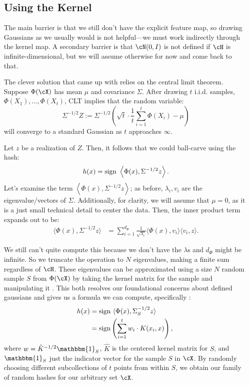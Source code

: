 \documentclass[twoside,11pt]{homework}
\begin{document}
\begin{multicols}{2}
\subsection{Using the Kernel}

The main barrier is that we still don't have the explicit feature map,
so drawing Gaussians as we usually would is not helpful---we must work
indirectly through the kernel map.  A secondary barrier is that
$\cN(0,I)$ is not defined if $\cH$ is infinite-dimensional, but we
will assume otherwise for now and come back to that.

The clever solution that \cite{K2012} came up with relies on the central limit theorem. Suppose $\Phi(\cX)$ has mean $\mu$ and covariance $\Sigma$. After drawing $t$ i.i.d. samples, $\Phi(X_1),\dotsc, \Phi(X_t)$, CLT implies that the random variable:
\[\Sigma^{-1/2} Z := \Sigma^{-1/2} \left(\sqrt{t} \cdot \frac{1}{t} \sum_{i=1}^t \Phi(X_i) - \mu\right)\]
will converge to a standard Gaussian as $t$ approaches $\infty$.

Let $z$ be a realization of $Z$. Then, it follows that we could ball-carve using the hash:
\[h(x) = \operatorname{sign} \ \left\langle \Phi(x), \Sigma^{-1/2}z\right\rangle.\]
Let's examine the term $\left\langle \Phi(x), \Sigma^{-1/2}z\right\rangle$; as before, $\lambda_i, v_i$ are the eigenvalue/vectors of $\Sigma$. Additionally, for clarity, we will assume that $\mu = 0$, as it is a just small technical detail to center the data. Then, the inner product term expands out to be:
\begin{align*}
  \langle \Phi(x), \Sigma^{-1/2} z\rangle &= \sum_{i=1}^{d_\Phi} \frac{1}{\sqrt{\lambda_i}} \langle \Phi(x), v_i\rangle \langle v_i , z\rangle.
\end{align*}

We still can't quite compute this because we don't have the $\lambda$s
and $d_\Phi$ might be infinite.  So we truncate the operation to $N$
eigenvalues, making a finite sum regardless of $\cH$.  These
eigenvalues can be approximated using a size $N$ random sample $S$ from
$\Phi(\cX)$ by taking the kernel matrix for the sample and
manipulating it \cite{something}.  This both resolves our foundational
concerns about defined gaussians and gives us a formula we can
compute, specifically \cite{K2012}:
\begin{align}
  h(x) &= \operatorname{sign} \ \langle \Phi(x), \Sigma_S^{-1/2} z\rangle \nonumber\\ 
  &= \operatorname{sign}\left(\sum_{i=1}^t w_i \cdot K(x_i, x)\right),\
\end{align}
where $w = \hat{K}^{-1/2}\mathbbm{1}_S$, $\hat{K}$ is the centered kernel matrix for $S$, and $\mathbbm{1}_S$ just the indicator vector for the sample $S$ in $\cX$. By randomly choosing different subcollections of $t$ points from within $S$, we obtain our family of random hashes for our arbitrary set $\cX$.


\end{multicols}
\end{document}
